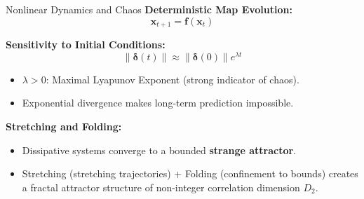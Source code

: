 \documentclass[10pt,aspectratio=169]{beamer}
\begin{document}
  
  
  
  



\begin{frame}{Nonlinear Dynamics and Chaos}
  \textbf{Deterministic Map Evolution:}
  \begin{equation*}
    \mathbf{x}_{t+1} = \mathbf{f}(\mathbf{x}_t)
  \end{equation*}
  
  \textbf{Sensitivity to Initial Conditions:}
  \begin{equation*}
    \|\bm{\delta}(t)\| \approx \|\bm{\delta}(0)\| e^{\lambda t}
  \end{equation*}
  \begin{itemize}
    \item $\lambda > 0$: Maximal Lyapunov Exponent (strong indicator of chaos).
    \item Exponential divergence makes long-term prediction impossible.
  \end{itemize}
  
  \textbf{Stretching and Folding:}
  \begin{itemize}
    \item Dissipative systems converge to a bounded \textbf{strange attractor}.
    \item Stretching (stretching trajectories) + Folding (confinement to bounds) creates a fractal attractor structure of non-integer correlation dimension $D_2$.
  \end{itemize}
\end{frame}
\end{document}
